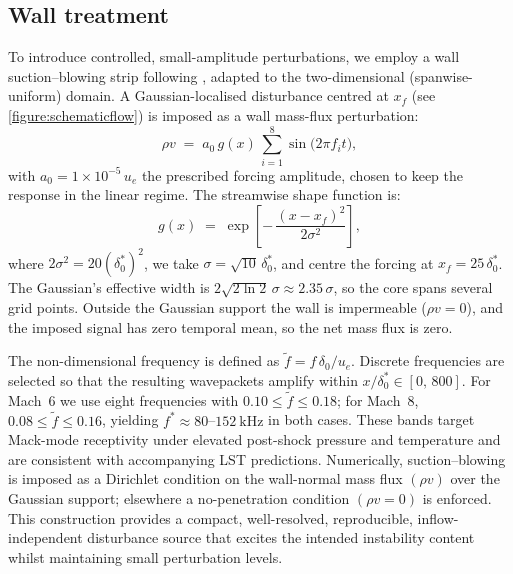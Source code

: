 
\subsection{Wall treatment}

To introduce controlled, small-amplitude perturbations, we employ a wall suction--blowing strip following \cite{AlamSandham2000}, adapted to the two-dimensional (spanwise-uniform) domain. A Gaussian-localised disturbance centred at $x_f$ (see \cref{figure:schematicflow}) is imposed as a wall mass-flux perturbation:
\begin{equation}
  \rho v \;=\; a_0\, g(x)\, \sum_{i=1}^{8} \sin\!\big(2\pi f_i t\big),
\end{equation}
with $a_0 = 1\times10^{-5}\,u_e$ the prescribed forcing amplitude, chosen to keep the response in the linear regime. The streamwise shape function is:
\begin{equation}
  g(x) \;=\; \exp\!\left[-\,\frac{(x-x_f)^2}{2\sigma^2}\right],
\end{equation}
where $2\sigma^2 = 20(\delta_0^{*})^2$, we take $\sigma=\sqrt{10}\,\delta_0^{*}$, and centre the forcing at $x_f = 25\,\delta_0^{*}$. The Gaussian's effective width is $2\sqrt{2\ln 2}\,\sigma \approx 2.35\,\sigma$, so the core spans several grid points. Outside the Gaussian support the wall is impermeable ($\rho v=0$), and the imposed signal has zero temporal mean, so the net mass flux is zero.

The non-dimensional frequency is defined as $\tilde{f} = f\,\delta_0/u_e$. Discrete frequencies are selected so that the resulting wavepackets amplify within $x/\delta_0^{*}\in[0,\,800]$. For Mach~6 we use eight frequencies with $0.10 \le \tilde{f} \le 0.18$; for Mach~8, $0.08 \le \tilde{f} \le 0.16$, yielding $f^{*}\approx 80$--$152~\mathrm{kHz}$ in both cases. These bands target Mack-mode receptivity under elevated post-shock pressure and temperature and are consistent with accompanying \gls{LST} predictions. Numerically, suction--blowing is imposed as a Dirichlet condition on the wall-normal mass flux $(\rho v)$ over the Gaussian support; elsewhere a no-penetration condition $(\rho v=0)$ is enforced. This construction provides a compact, well-resolved, reproducible, inflow-independent disturbance source that excites the intended instability content whilst maintaining small perturbation levels.

